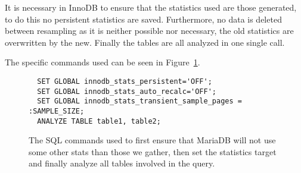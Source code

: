 It is necessary in InnoDB to ensure that the statistics used are those
generated, to do this no persistent statistics are saved. Furthermore, no data
is deleted between resampling as it is neither possible nor necessary, the old
statistics are overwritten by the new. Finally the tables are all analyzed in
one single  call.

The specific commands used can be seen in Figure~\ref{fig:sql:resamplemdb}.

\begin{figure}[ht]
\begin{verbatim}
  SET GLOBAL innodb_stats_persistent='OFF';
  SET GLOBAL innodb_stats_auto_recalc='OFF';
  SET GLOBAL innodb_stats_transient_sample_pages = :SAMPLE_SIZE;
  ANALYZE TABLE table1, table2;
\end{verbatim}
\caption[The SQL commands used to resample in MariaDB.]{The SQL commands used to
first ensure that MariaDB will not use some other stats than those we gather,
then set the statistics target and finally analyze all tables involved in the query.}
\label{fig:sql:resamplemdb}
\end{figure}